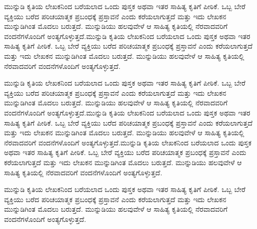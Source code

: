 \newpage
\begin{center}
\Large\textbf{\color{blue}{ಸ್ವೀಕೃತಿ}}
\end{center}
\vspace{1cm}
ಮುನ್ನುಡಿ ಕೃತಿಯ ಲೇಖಕನಿಂದ ಬರೆಯಲಾದ ಒಂದು ಪುಸ್ತಕ ಅಥವಾ ಇತರ ಸಾಹಿತ್ಯ ಕೃತಿಗೆ ಪೀಠಿಕೆ. ಒಬ್ಬ ಬೇರೆ ವ್ಯಕ್ತಿಯು ಬರೆದ ಪರಿಚಯಾತ್ಮಕ ಪ್ರಬಂಧಕ್ಕೆ ಪ್ರಸ್ತಾವನೆ ಎಂದು ಕರೆಯಲಾಗುತ್ತದೆ ಮತ್ತು ಇದು ಲೇಖಕನ ಮುನ್ನುಡಿಗಿಂತ ಮೊದಲು ಬರುತ್ತದೆ. ಮುನ್ನುಡಿಯು ಹಲವುವೇಳೆ ಆ ಸಾಹಿತ್ಯ ಕೃತಿಯಲ್ಲಿ ನೆರವಾದವರಿಗೆ ವಂದನೆಗಳೊಂದಿಗೆ ಅಂತ್ಯಗೊಳ್ಳುತ್ತದೆ.ಮುನ್ನುಡಿ ಕೃತಿಯ ಲೇಖಕನಿಂದ ಬರೆಯಲಾದ ಒಂದು ಪುಸ್ತಕ ಅಥವಾ ಇತರ ಸಾಹಿತ್ಯ ಕೃತಿಗೆ ಪೀಠಿಕೆ. ಒಬ್ಬ ಬೇರೆ ವ್ಯಕ್ತಿಯು ಬರೆದ ಪರಿಚಯಾತ್ಮಕ ಪ್ರಬಂಧಕ್ಕೆ ಪ್ರಸ್ತಾವನೆ ಎಂದು ಕರೆಯಲಾಗುತ್ತದೆ ಮತ್ತು ಇದು ಲೇಖಕನ ಮುನ್ನುಡಿಗಿಂತ ಮೊದಲು ಬರುತ್ತದೆ. ಮುನ್ನುಡಿಯು ಹಲವುವೇಳೆ ಆ ಸಾಹಿತ್ಯ ಕೃತಿಯಲ್ಲಿ ನೆರವಾದವರಿಗೆ ವಂದನೆಗಳೊಂದಿಗೆ ಅಂತ್ಯಗೊಳ್ಳುತ್ತದೆ.
\vspace{1cm}

ಮುನ್ನುಡಿ ಕೃತಿಯ ಲೇಖಕನಿಂದ ಬರೆಯಲಾದ ಒಂದು ಪುಸ್ತಕ ಅಥವಾ ಇತರ ಸಾಹಿತ್ಯ ಕೃತಿಗೆ ಪೀಠಿಕೆ. ಒಬ್ಬ ಬೇರೆ ವ್ಯಕ್ತಿಯು ಬರೆದ ಪರಿಚಯಾತ್ಮಕ ಪ್ರಬಂಧಕ್ಕೆ ಪ್ರಸ್ತಾವನೆ ಎಂದು ಕರೆಯಲಾಗುತ್ತದೆ ಮತ್ತು ಇದು ಲೇಖಕನ ಮುನ್ನುಡಿಗಿಂತ ಮೊದಲು ಬರುತ್ತದೆ. ಮುನ್ನುಡಿಯು ಹಲವುವೇಳೆ ಆ ಸಾಹಿತ್ಯ ಕೃತಿಯಲ್ಲಿ ನೆರವಾದವರಿಗೆ ವಂದನೆಗಳೊಂದಿಗೆ ಅಂತ್ಯಗೊಳ್ಳುತ್ತದೆ.ಮುನ್ನುಡಿ ಕೃತಿಯ ಲೇಖಕನಿಂದ ಬರೆಯಲಾದ ಒಂದು ಪುಸ್ತಕ ಅಥವಾ ಇತರ ಸಾಹಿತ್ಯ ಕೃತಿಗೆ ಪೀಠಿಕೆ. ಒಬ್ಬ ಬೇರೆ ವ್ಯಕ್ತಿಯು ಬರೆದ ಪರಿಚಯಾತ್ಮಕ ಪ್ರಬಂಧಕ್ಕೆ ಪ್ರಸ್ತಾವನೆ ಎಂದು ಕರೆಯಲಾಗುತ್ತದೆ ಮತ್ತು ಇದು ಲೇಖಕನ ಮುನ್ನುಡಿಗಿಂತ ಮೊದಲು ಬರುತ್ತದೆ. ಮುನ್ನುಡಿಯು ಹಲವುವೇಳೆ ಆ ಸಾಹಿತ್ಯ ಕೃತಿಯಲ್ಲಿ ನೆರವಾದವರಿಗೆ ವಂದನೆಗಳೊಂದಿಗೆ ಅಂತ್ಯಗೊಳ್ಳುತ್ತದೆ.ಮುನ್ನುಡಿ ಕೃತಿಯ ಲೇಖಕನಿಂದ ಬರೆಯಲಾದ ಒಂದು ಪುಸ್ತಕ ಅಥವಾ ಇತರ ಸಾಹಿತ್ಯ ಕೃತಿಗೆ ಪೀಠಿಕೆ. ಒಬ್ಬ ಬೇರೆ ವ್ಯಕ್ತಿಯು ಬರೆದ ಪರಿಚಯಾತ್ಮಕ ಪ್ರಬಂಧಕ್ಕೆ ಪ್ರಸ್ತಾವನೆ ಎಂದು ಕರೆಯಲಾಗುತ್ತದೆ ಮತ್ತು ಇದು ಲೇಖಕನ ಮುನ್ನುಡಿಗಿಂತ ಮೊದಲು ಬರುತ್ತದೆ. ಮುನ್ನುಡಿಯು ಹಲವುವೇಳೆ ಆ ಸಾಹಿತ್ಯ ಕೃತಿಯಲ್ಲಿ ನೆರವಾದವರಿಗೆ ವಂದನೆಗಳೊಂದಿಗೆ ಅಂತ್ಯಗೊಳ್ಳುತ್ತದೆ.

\vspace{1cm}
ಮುನ್ನುಡಿ ಕೃತಿಯ ಲೇಖಕನಿಂದ ಬರೆಯಲಾದ ಒಂದು ಪುಸ್ತಕ ಅಥವಾ ಇತರ ಸಾಹಿತ್ಯ ಕೃತಿಗೆ ಪೀಠಿಕೆ. ಒಬ್ಬ ಬೇರೆ ವ್ಯಕ್ತಿಯು ಬರೆದ ಪರಿಚಯಾತ್ಮಕ ಪ್ರಬಂಧಕ್ಕೆ ಪ್ರಸ್ತಾವನೆ ಎಂದು ಕರೆಯಲಾಗುತ್ತದೆ ಮತ್ತು ಇದು ಲೇಖಕನ ಮುನ್ನುಡಿಗಿಂತ ಮೊದಲು ಬರುತ್ತದೆ. ಮುನ್ನುಡಿಯು ಹಲವುವೇಳೆ ಆ ಸಾಹಿತ್ಯ ಕೃತಿಯಲ್ಲಿ ನೆರವಾದವರಿಗೆ ವಂದನೆಗಳೊಂದಿಗೆ ಅಂತ್ಯಗೊಳ್ಳುತ್ತದೆ.